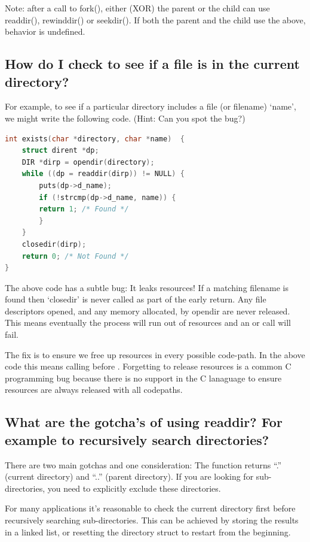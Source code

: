 Note: after a call to fork(), either (XOR) the parent or the child can use readdir(), rewinddir() or seekdir(). If both the parent and the child use the above, behavior is undefined.

\subsection{How do I check to see if a file is in the current directory?}

For example, to see if a particular directory includes a file (or filename) `name', we might write the following code. (Hint: Can you spot the bug?)

\begin{lstlisting}[language=C]
int exists(char *directory, char *name)  {
    struct dirent *dp;
    DIR *dirp = opendir(directory);
    while ((dp = readdir(dirp)) != NULL) {
        puts(dp->d_name);
        if (!strcmp(dp->d_name, name)) {
        return 1; /* Found */
        }
    }
    closedir(dirp);
    return 0; /* Not Found */
}
\end{lstlisting}

The above code has a subtle bug: It leaks resources! If a matching filename is found then `closedir' is never called as part of the early return. Any file descriptors opened, and any memory allocated, by opendir are never released. This means eventually the process will run out of resources and an  or  call will fail.

The fix is to ensure we free up resources in every possible code-path. In the above code this means calling  before . Forgetting to release resources is a common C programming bug because there is no support in the C lanaguage to ensure resources are always released with all codepaths.

\subsection{What are the gotcha's of using readdir? For example to recursively search directories?}

There are two main gotchas and one consideration: The  function returns ``.'' (current directory) and ``..'' (parent directory). If you are looking for sub-directories, you need to explicitly exclude these directories.

For many applications it's reasonable to check the current directory first before recursively searching sub-directories. This can be achieved by storing the results in a linked list, or resetting the directory struct to restart from the beginning.

